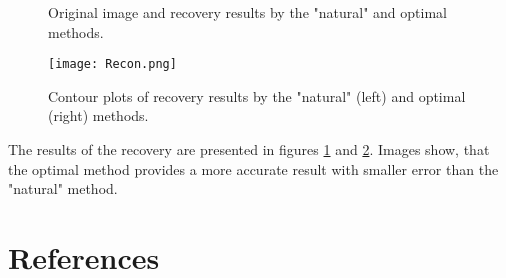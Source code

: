 \documentclass[12pt]{iopart}
\begin{document}
	\begin{figure}[H]
		\caption{Original image and recovery results by the "natural" and optimal methods.}
		\label{1}
	\end{figure}
	
	\begin{figure}[h]
		{\texttt{[image: Recon.png]}}
		\caption{Contour plots of recovery results by the "natural" (left) and optimal (right) methods.}
		\label{2}
	\end{figure}
	The results of the recovery are presented in figures \ref{1} and \ref{2}. Images show, that the optimal method provides a more accurate result with smaller error than the "natural" method.
	
	
	\section*{References}
	
	
	
\end{document}
